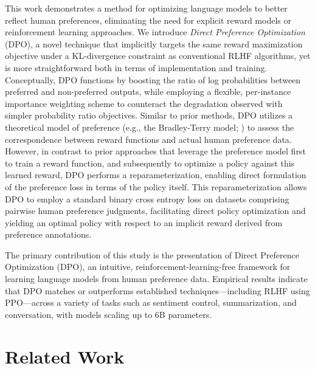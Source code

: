 This work demonstrates a method for optimizing language models to better reflect human preferences, eliminating the need for explicit reward models or reinforcement learning approaches. We introduce \textit{Direct Preference Optimization} (DPO), a novel technique that implicitly targets the same reward maximization objective under a KL-divergence constraint as conventional RLHF algorithms, yet is more straightforward both in terms of implementation and training. Conceptually, DPO functions by boosting the ratio of log probabilities between preferred and non-preferred outputs, while employing a flexible, per-instance importance weighting scheme to counteract the degradation observed with simpler probability ratio objectives. Similar to prior methods, DPO utilizes a theoretical model of preference (e.g., the Bradley-Terry model; \cite{bradley1952rankanalysis}) to assess the correspondence between reward functions and actual human preference data. However, in contrast to prior approaches that leverage the preference model first to train a reward function, and subsequently to optimize a policy against this learned reward, DPO performs a reparameterization, enabling direct formulation of the preference loss in terms of the policy itself. This reparameterization allows DPO to employ a standard binary cross entropy loss on datasets comprising pairwise human preference judgments, facilitating direct policy optimization and yielding an optimal policy with respect to an implicit reward derived from preference annotations.

The primary contribution of this study is the presentation of Direct Preference Optimization (DPO), an intuitive, reinforcement-learning-free framework for learning language models from human preference data. Empirical results indicate that DPO matches or outperforms established techniques—including RLHF using PPO—across a variety of tasks such as sentiment control, summarization, and conversation, with models scaling up to 6B parameters.

\section{Related Work}

